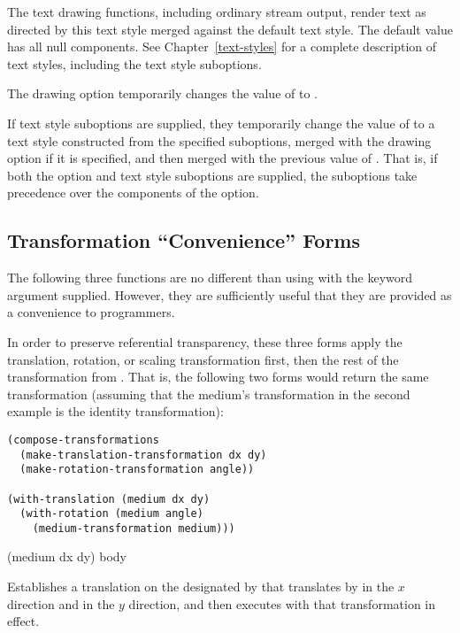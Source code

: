 The text drawing functions, including ordinary stream output, render text as
directed by this text style merged against the default text style.  The default
value has all null components.  See Chapter~\ref{text-styles} for a complete
description of text styles, including the text style suboptions.

The   drawing option temporarily changes the value of
 to .

If text style suboptions are supplied, they temporarily change the value of
 to a text style constructed from the
specified suboptions, merged with the  drawing option if it is
specified, and then merged with the previous value of .  That is, if both the  option and text style
suboptions are supplied, the suboptions take precedence over the components of
the  option.


\subsection {Transformation ``Convenience'' Forms}

The following three functions are no different than using
 with the  keyword argument
supplied.  However, they are sufficiently useful that they are provided as a
convenience to programmers.

In order to preserve referential transparency, these three forms apply the
translation, rotation, or scaling transformation first, then the rest of the
transformation from .  That is, the
following two forms would return the same transformation (assuming that the
medium's transformation in the second example is the identity transformation):

\begin{verbatim}
(compose-transformations
  (make-translation-transformation dx dy)
  (make-rotation-transformation angle))

(with-translation (medium dx dy)
  (with-rotation (medium angle)
    (medium-transformation medium)))
\end{verbatim}

 {(medium dx dy) \body body}

Establishes a translation on the  designated by  that
translates by  in the $x$ direction and  in the $y$ direction,
and then executes  with that transformation in effect.

